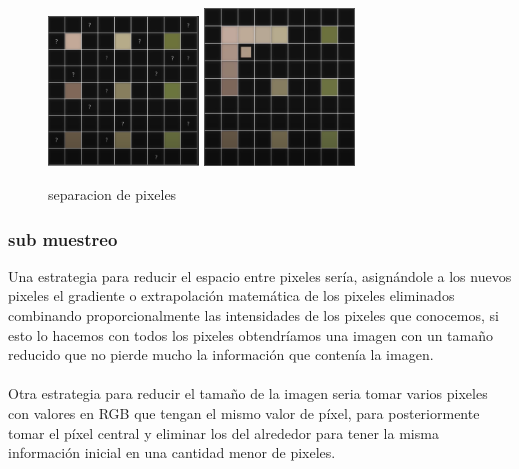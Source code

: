 \documentclass{article}
\begin{document}
\begin{figure}[h]
\includegraphics[width=4cm]{matriz_a_llenar.png}
\includegraphics[width=4cm]{llenado_de_matriz.png}
\centering
\caption{separacion de pixeles}
\label{fig:matriz de leds}
\end{figure}






\subsubsection{sub muestreo }\label{contenido}
Una estrategia para reducir el espacio entre pixeles sería, asignándole a los nuevos pixeles el gradiente o extrapolación matemática de los pixeles eliminados combinando proporcionalmente las intensidades de los pixeles que conocemos, si esto lo hacemos con todos los pixeles obtendríamos una imagen con un tamaño reducido que no pierde mucho la información que contenía la imagen. \\\\
Otra estrategia para reducir el tamaño de la imagen seria tomar varios pixeles con valores en RGB que tengan el mismo valor de píxel, para posteriormente tomar el píxel central y eliminar los del alrededor para tener la misma información inicial en una cantidad menor de pixeles.\\\\
\end{document}
